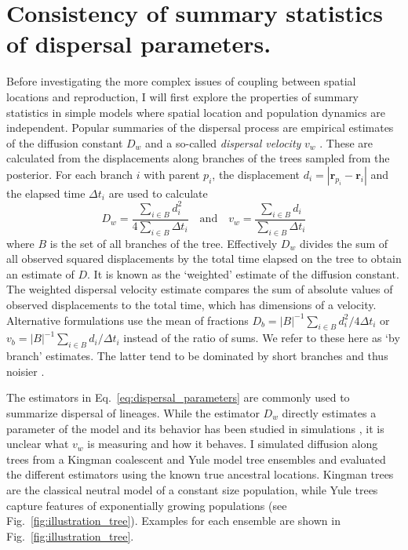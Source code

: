 \documentclass[aps,rmp, twocolumn]{revtex4}
\newcommand{\rvec}{\mathbf{r}}
\begin{document}
\section*{Consistency of summary statistics of dispersal parameters.}
Before investigating the more complex issues of coupling between spatial locations and reproduction, I will first explore the properties of summary statistics in simple models where spatial location and population dynamics are independent.
Popular summaries of the dispersal process are empirical estimates of the diffusion constant $D_w$ \citep{pybus_unifying_2012,trovao_bayesian_2015} and a so-called \emph{dispersal velocity} $v_w$ \citep{dellicour_using_2017}.
These are calculated from the displacements along branches of the trees sampled from the posterior.
For each branch $i$ with parent $p_i$, the displacement $d_i = |\rvec_{p_i} - \rvec_{i}|$ and the elapsed time $\Delta t_i$ are used to calculate
\begin{equation}
    \label{eq:dispersal_parameters}
    D_w = \frac{\sum_{i\in B}d_i^2}{4\sum_{i\in B} \Delta t_i} \quad \mathrm{and}  \quad v_w = \frac{\sum_{i\in B} d_i}{\sum_{i\in B} \Delta t_i}
\end{equation}
where $B$ is the set of all branches of the tree.
Effectively $D_w$ divides the sum of all observed squared displacements by the total time elapsed on the tree to obtain an estimate of $D$.
It is known as the `weighted' estimate of the diffusion constant.
The weighted dispersal velocity estimate compares the sum of absolute values of observed displacements to the total time, which has dimensions of a velocity.
Alternative formulations use the mean of fractions $D_b = |B|^{-1} \sum_{i\in B}d_i^2/4\Delta t_i$ or $v_b = |B|^{-1} \sum_{i\in B}d_i/\Delta t_i$ instead of the ratio of sums.
We refer to these here as `by branch' estimates.
The latter tend to be dominated by short branches and thus noisier \citep{trovao_bayesian_2015}.

The estimators in Eq.~\ref{eq:dispersal_parameters} are commonly used to summarize dispersal of lineages.
While the estimator $D_w$ directly estimates a parameter of the model and its behavior has been studied in simulations \citep{pybus_unifying_2012}, it is unclear what $v_w$ is measuring and how it behaves.
I simulated diffusion along trees from a Kingman coalescent\citep{kingman_coalescent_1982} and Yule model \citep{yule_iimathematical_1925} tree ensembles and evaluated the different estimators using the known true ancestral locations.
Kingman trees are the classical neutral model of a constant size population, while Yule trees capture features of exponentially growing populations (see Fig.~\ref{fig:illustration_tree}).
Examples for each ensemble are shown in Fig.~\ref{fig:illustration_tree}.
\end{document}
